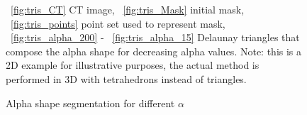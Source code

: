 \documentclass{llncs}
\begin{document}
\begin{figure}[ht!]
{  \label{fig:tris_alpha_50}
  }

  \caption{~\ref{fig:tris_CT} CT image, ~\ref{fig:tris_Mask} initial mask, ~\ref{fig:tris_points} point set used to represent mask, ~\ref{fig:tris_alpha_200} - ~\ref{fig:tris_alpha_15} Delaunay triangles that compose the alpha shape for decreasing alpha values. Note: this is a 2D example for illustrative purposes, the actual method is performed in 3D with tetrahedrons instead of triangles. }
  \label{fig:tris}
\end{figure}


\begin{figure}[t]
  \centering
  \caption{Alpha shape segmentation for different $\alpha$}
  \label{fig:alphashapes}
\end{figure}
%
\end{document}
